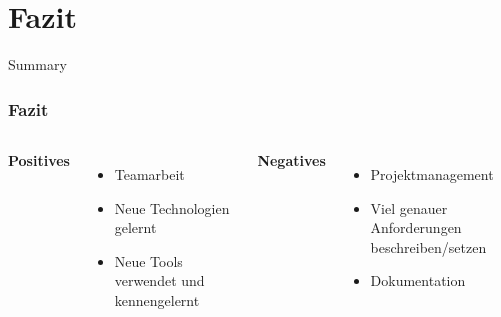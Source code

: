 \documentclass[10pt, compress]{beamer}
\begin{document}
\section{Fazit}
\begin{frame}{Summary}
\frametitle{Fazit}
\begin{columns}[onlytextwidth]
      \textbf{Positives}
\begin{itemize}
  \item Teamarbeit
  \item Neue Technologien gelernt
  \item Neue Tools verwendet und kennengelernt
\end{itemize}

    \textbf{Negatives}
\begin{itemize}
  \item Projektmanagement
  \item Viel genauer Anforderungen beschreiben/setzen
  \item Dokumentation
\end{itemize}
  \end{columns}

\end{frame}

\end{document}
